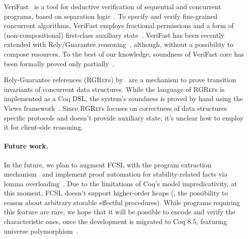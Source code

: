 VeriFast~\cite{Jacobs-al:NFM11} is a tool for deductive verification
of sequential and concurrent programs, based on separation
logic~\cite{Reynolds:LICS02}.
% 
%
To specify and verify fine-grained concurrent algorithms, VeriFast
employs fractional permissions and a form of (non-compositional)
first-class auxiliary state~\cite{Jacobs-Piessens:POPL11}. VeriFast
has been recently extended with Rely/Guarantee
reasoning~\cite{Jacobs-al:sharedboxes}, although, without a
possibility to compose resources. To the best of our knowledge,
soundness of VeriFast core has been formally proved only
partially~\cite{Vogels:PhD}.




Rely-Guarantee references (\textsc{RGRef}s) by~\citet{Gordon:PhD} are
a mechanism to prove transition invariants of concurrent data
structures.
%
%
While the language of \textsc{RGRef}s is implemented as a Coq DSL, the
system's soundness is proved by hand using the Views
framework~\cite{DinsdaleYoung-al:POPL13}.
%
Since \textsc{RGRef}s focuses on correctness of data structures \wrt
specific protocols and doesn't provide auxiliary state, it's unclear
how to employ it for client-side reasoning.


\paragraph{Future work.~~}
\label{sec:future-work}

In the future, we plan to augment FCSL with the program extraction
mechanism~\cite{Letouzey:CIE08} and implement proof automation for
stability-related facts via lemma
overloading~\cite{Gonthier-al:ICFP11}.
%
Due to the limitations of Coq's model \wrt impredicativity, at this
moment, FCSL doesn't support higher-order heaps (\ie, the possibility
to reason about arbitrary storable effectful procedures). While programs
requiring this feature are rare, we hope that it will be possible to
encode and verify the characteristic ones, once the development is
migrated to Coq 8.5, featuring universe
polymorphism~\cite{Sozeau-Tabareau:ITP14}.

